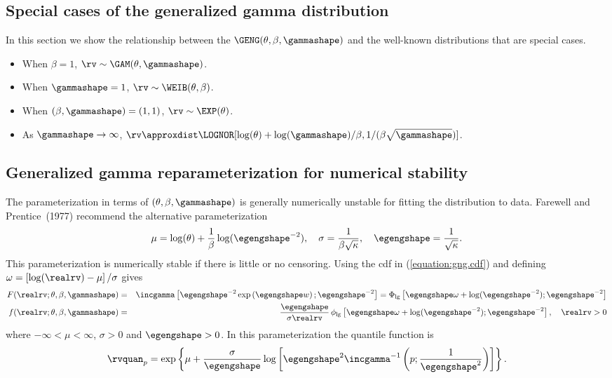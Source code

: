 \subsection{Special cases of the generalized gamma distribution}
\label{section:gng.special.cases}
In this section we show the relationship between the 
$\GENG(\theta,\beta,\gammashape)$
and the well-known distributions that are special cases.
\begin{itemize} 	
\item 	
When $\beta=1$,
$\rv \sim \GAM(\theta,\gammashape)$.  	
\item 
When $\gammashape=1$,
$\rv \sim \WEIB(\theta,\beta)$.
\item
When $(\beta,\gammashape)=(1,1)$,
$\rv \sim \EXP(\theta)$.  	
\item 
As $\gammashape \rightarrow \infty$, $\rv \approxdist
\LOGNOR[\log(\theta)+ \log(\gammashape)/\beta,1/(\beta \sqrt{\gammashape})]$.
  \end{itemize}


\subsection{Generalized gamma reparameterization for 
numerical stability}
\label{section:gng.reparameterization}
The parameterization in terms of $(\theta, \beta, \gammashape)$
is generally numerically unstable for fitting the distribution to data. 
Farewell and Prentice~(1977) recommend the alternative
parameterization
\begin{displaymath}
\mu=\log(\theta)+\frac{1}{\beta}
\log(\egengshape^{-2}),
\quad
\sigma=\frac{1}{\beta \sqrt{\kappa}},
\quad
\egengshape=\frac{1}{\sqrt{\kappa}}.
\end{displaymath}
This parameterization is numerically stable if
there is little or no censoring.
Using the cdf in (\ref{equation:gng.cdf})
and defining $\omega=\left [\log(\realrv)-\mu \right ]/\sigma$ gives
\begin{eqnarray*}  
 F(\realrv;\theta,\beta,\gammashape)&=&
\incgamma \left [
	     \egengshape^{-2}  \exp
			\left (
			 \egengshape w
			\right ); \egengshape^{-2}
	    \right ]
=
\Phi_{\rm lg} \left [\egengshape \omega+
\log(\egengshape^{-2});\egengshape^{-2}
\right ]
\\ 
 f(\realrv;\theta,\beta,\gammashape)&=&
\frac{\egengshape}{\sigma \realrv} \, \phi_{\rm lg}
\left [
\egengshape \omega+
\log(\egengshape^{-2});\egengshape^{-2}
\right ], \quad \realrv > 0
\end{eqnarray*} 
where $-\infty<\mu<\infty$, $\sigma>0$ and $\egengshape>0$.  In this
parameterization the quantile function is
\begin{displaymath}
\rvquan_{p}=\exp \left \{\mu + \frac{\sigma}{\egengshape} \log
\left [ \egengshape^{2}\incgamma^{-1} \left (
p; \frac{1}{\egengshape^{2}} 				 \right )
\right ] \right \}.
\end{displaymath}


